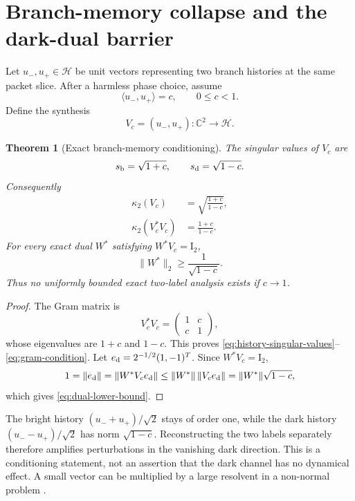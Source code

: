 \documentclass[11pt]{article}
\newtheorem{theorem}{Theorem}[section]
\theoremstyle{definition}
\theoremstyle{remark}
\newcommand{\C}{\mathbb C}
\newcommand{\Id}{\mathrm I}
\newcommand{\cH}{\mathcal H}
\begin{document}
\section{Branch-memory collapse and the dark-dual barrier}
\label{sec:memory}

Let $u_-,u_+\in\cH$ be unit vectors representing two branch histories at the
same packet slice.  After a harmless phase choice, assume
\begin{equation}\label{eq:overlap}
 \langle u_-,u_+\rangle=c,
 \qquad0\le c<1.
\end{equation}
Define the synthesis
\begin{equation}\label{eq:history-synthesis}
 V_c=(u_-,u_+):\C^2\to\cH.
\end{equation}

\begin{theorem}[Exact branch-memory conditioning]
\label{thm:memory-conditioning}
The singular values of $V_c$ are
\begin{equation}\label{eq:history-singular-values}
 s_{\rm b}=\sqrt{1+c},
 \qquad
 s_{\rm d}=\sqrt{1-c}.
\end{equation}
Consequently
\begin{align}
 \kappa_2(V_c)
 &=\sqrt{\frac{1+c}{1-c}},
 \label{eq:synthesis-condition}\\
 \kappa_2(V_c^*V_c)
 &=\frac{1+c}{1-c}.
 \label{eq:gram-condition}
\end{align}
For every exact dual $W^*$ satisfying $W^*V_c=\Id_2$,
\begin{equation}\label{eq:dual-lower-bound}
 \boxed{\|W^*\|_2\ge\frac1{\sqrt{1-c}}.}
\end{equation}
Thus no uniformly bounded exact two-label analysis exists if $c\to1$.
\end{theorem}

\begin{proof}
The Gram matrix is
\[
 V_c^*V_c=\begin{pmatrix}1&c\\c&1\end{pmatrix},
\]
whose eigenvalues are $1+c$ and $1-c$.  This proves
\eqref{eq:history-singular-values}--\eqref{eq:gram-condition}.  Let
$e_{\rm d}=2^{-1/2}(1,-1)^T$.  Since $W^*V_c=\Id_2$,
\[
 1=\|e_{\rm d}\|
 =\|W^*V_ce_{\rm d}\|
 \le\|W^*\|\,\|V_ce_{\rm d}\|
 =\|W^*\|\sqrt{1-c},
\]
which gives \eqref{eq:dual-lower-bound}.
\end{proof}

The bright history $(u_-+u_+)/\sqrt2$ stays of order one, while the dark
history $(u_--u_+)/\sqrt2$ has norm $\sqrt{1-c}$.  Reconstructing the two
labels separately therefore amplifies perturbations in the vanishing dark
direction.  This is a conditioning statement, not an assertion that the
dark channel has no dynamical effect.  A small vector can be multiplied by a
large resolvent in a non-normal problem \citep{StewartSun1990,TrefethenEmbree2005}.
\end{document}
